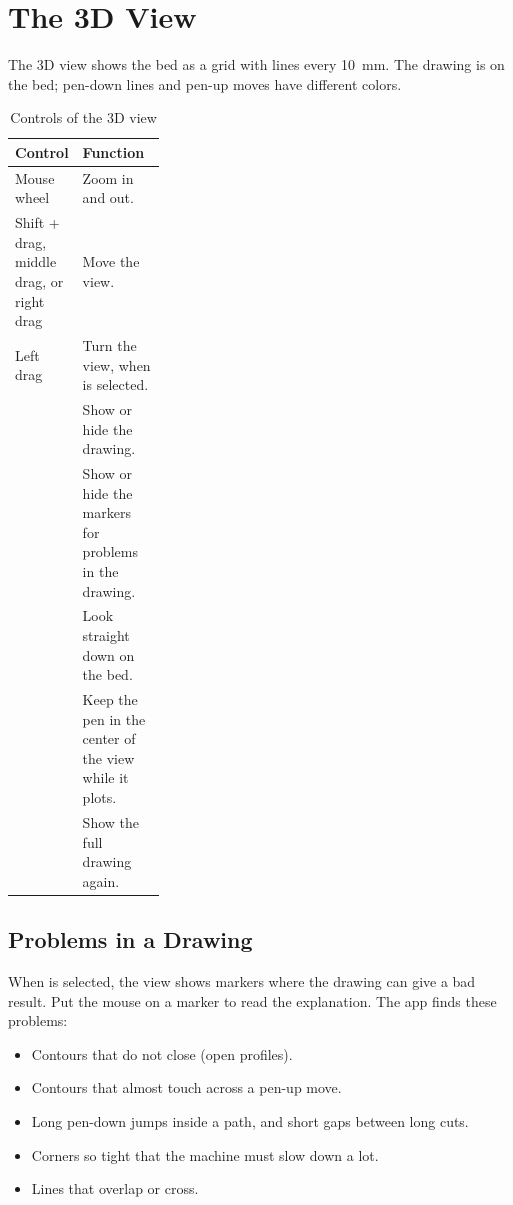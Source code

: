 \section{The 3D View}

The 3D view shows the bed as a grid with lines every \SI{10}{mm}. The drawing
is on the bed; pen-down lines and pen-up moves have different colors.

\begin{table}[htbp]
\centering
\caption{Controls of the 3D view}\label{tab:view}
\begin{tabularx}{\linewidth}{@{}P{0.3\linewidth}L@{}}
\toprule
\textbf{Control} & \textbf{Function} \\
\midrule
Mouse wheel & Zoom in and out. \\
Shift + drag, middle drag, or right drag & Move the view. \\
Left drag & Turn the view, when  is selected. \\
 & Show or hide the drawing. \\
 & Show or hide the markers for problems in the drawing. \\
 & Look straight down on the bed. \\
 & Keep the pen in the center of the view while it plots. \\
 & Show the full drawing again. \\
\bottomrule
\end{tabularx}
\end{table}

\subsection{Problems in a Drawing}

When  is selected, the view shows markers where the drawing can
give a bad result. Put the mouse on a marker to read the explanation. The app
finds these problems:

\begin{itemize}
  \item Contours that do not close (open profiles).
  \item Contours that almost touch across a pen-up move.
  \item Long pen-down jumps inside a path, and short gaps between long cuts.
  \item Corners so tight that the machine must slow down a lot.
  \item Lines that overlap or cross.
\end{itemize}

